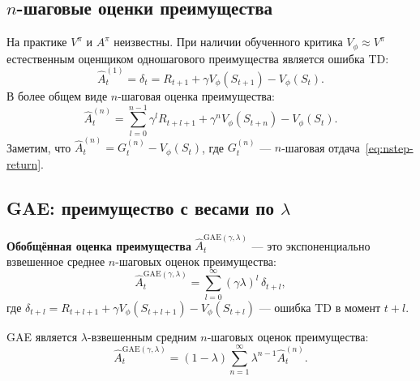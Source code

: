 \subsection{$n$-шаговые оценки преимущества}

На практике $V^\pi$ и $A^\pi$ неизвестны.  При наличии обученного критика $V_\phi \approx V^\pi$ естественным оценщиком одношагового преимущества является ошибка TD:
\begin{equation}
\label{eq:td-advantage}
\hat A_t^{(1)} = \delta_t = R_{t+1} + \gamma V_\phi(S_{t+1}) - V_\phi(S_t).
\end{equation}
В более общем виде $n$-шаговая оценка преимущества:
\begin{equation}
\label{eq:nstep-advantage}
\hat A_t^{(n)} = \sum_{l=0}^{n-1}\gamma^l R_{t+l+1} + \gamma^n V_\phi(S_{t+n}) - V_\phi(S_t).
\end{equation}
Заметим, что $\hat A_t^{(n)} = G_t^{(n)} - V_\phi(S_t)$, где $G_t^{(n)}$ --- $n$-шаговая отдача~\eqref{eq:nstep-return}.

\subsection{GAE: преимущество с весами по $\lambda$}

\begin{definition}
\label{def:gae}
\textbf{Обобщённая оценка преимущества} $\hat A_t^{\mathrm{GAE}(\gamma,\lambda)}$ --- это экспоненциально взвешенное среднее $n$-шаговых оценок преимущества:
\begin{equation}
\label{eq:gae}
\hat A_t^{\mathrm{GAE}(\gamma,\lambda)} = \sum_{l=0}^{\infty}(\gamma\lambda)^l\,\delta_{t+l},
\end{equation}
где $\delta_{t+l} = R_{t+l+1} + \gamma V_\phi(S_{t+l+1}) - V_\phi(S_{t+l})$ --- ошибка TD в момент $t+l$.
\end{definition}

\begin{proposition}
GAE является $\lambda$-взвешенным средним $n$-шаговых оценок преимущества:
\begin{equation}
\label{eq:gae-lambda-avg}
\hat A_t^{\mathrm{GAE}(\gamma,\lambda)} = (1-\lambda)\sum_{n=1}^{\infty}\lambda^{n-1}\hat A_t^{(n)}.
\end{equation}
\end{proposition}

